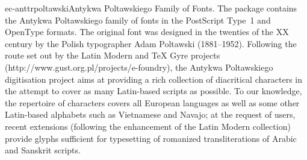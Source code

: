 \documentclass{ddltxtyp}
\begin{document}
\begin{package}{ec-anttr}{poltawski}{Antykwa Poltawskiego Family of Fonts.}
The package contains the Antykwa Poltawskiego family of fonts
in the PostScript Type~1 and OpenType formats. The original
font was designed in the twenties of the XX century by the
Polish typographer Adam Poltawski (1881--1952). Following the
route set out by the Latin Modern and {\TeX} Gyre projects
(http://www.gust.org.pl/projects/e-foundry), the Antykwa
Poltawskiego digitisation project aims at providing a rich
collection of diacritical characters in the attempt to cover as
many Latin-based scripts as possible. To our knowledge, the
repertoire of characters covers all European languages as well
as some other Latin-based alphabets such as Vietnamese and
Navajo; at the request of users, recent extensions (following
the enhancement of the Latin Modern collection) provide glyphs
sufficient for typesetting of romanized transliterations of
Arabic and Sanskrit scripts. %
\end{package}
\end{document}

